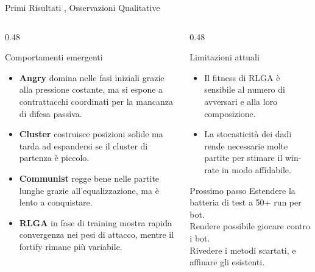 \documentclass[9pt,serif,usenames,dvipsnames]{beamer}
\begin{document}
	\begin{frame}{\centering Primi Risultati , Osservazioni Qualitative}
		\begin{columns}[T]
			\begin{column}{0.48\textwidth}
				\begin{block}{Comportamenti emergenti}
					\small
					\begin{itemize}
						\item \textbf{Angry} domina nelle fasi iniziali grazie alla pressione
						costante, ma si espone a contrattacchi coordinati per la
						mancanza di difesa passiva.
						\item \textbf{Cluster} costruisce posizioni solide ma tarda ad
						espandersi se il cluster di partenza è piccolo.
						\item \textbf{Communist} regge bene nelle partite lunghe grazie
						all'equalizzazione, ma è lento a conquistare.
						\item \textbf{RLGA} in fase di training mostra rapida convergenza
						nei pesi di attacco, mentre il fortify rimane più variabile.
					\end{itemize}
				\end{block}
			\end{column}
			\begin{column}{0.48\textwidth}
				\vspace{0.1cm}
				\begin{block}{Limitazioni attuali}
					\small
					\begin{itemize}
						\item Il fitness di RLGA è sensibile al \alert{numero di avversari}
						e alla loro composizione.
						\item La \alert{stocasticità} dei dadi rende necessarie molte
						partite per stimare il win-rate in modo affidabile.
					\end{itemize}
				\end{block}
				\vspace{0.2cm}
				\begin{alertblock}{Prossimo passo}
					\small
					Estendere la batteria di test a \alert{50+ run} per bot.\\
					Rendere possibile giocare contro i bot.\\
					Rivedere i metodi scartati, e affinare gli esistenti.
				\end{alertblock}
			\end{column}
		\end{columns}
	\end{frame}
\end{document}
